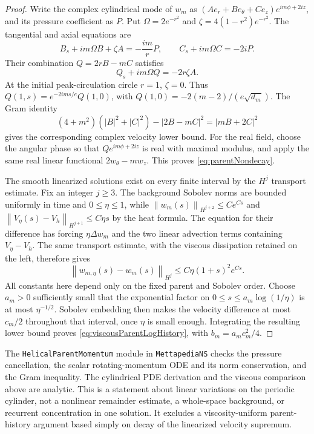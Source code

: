 \documentclass[11pt]{article}
\theoremstyle{remark}
\newcommand{\norm}[1]{\left\lVert#1\right\rVert}
\begin{document}
\begin{proof}
Write the complex cylindrical mode of $w_m$ as
$(A e_r+B e_\theta+C e_z)e^{im\phi+2iz}$, and its pressure
coefficient as $P$. Put $\Omega=2e^{-r^2}$ and
$\zeta=4(1-r^2)e^{-r^2}$. The tangential and axial equations are
\[
 B_s+im\Omega B+\zeta A=-\frac{im}{r}P,
 \qquad C_s+im\Omega C=-2iP.
\]
Their combination $Q=2rB-mC$ satisfies
\[
 Q_s+im\Omega Q=-2r\zeta A.
\]
At the initial peak-circulation circle $r=1$, $\zeta=0$. Thus
$Q(1,s)=e^{-2ims/e}Q(1,0)$, with
$Q(1,0)=-2(m-2)/(e\sqrt{d_m})$.
The Gram identity
\[
 (4+m^2)(|B|^2+|C|^2)-|2B-mC|^2=|mB+2C|^2
\]
gives the corresponding complex velocity lower bound. For the real
field, choose the angular phase so that $Qe^{im\phi+2iz}$ is real
with maximal modulus, and apply the same real linear functional
$2w_\theta-mw_z$. This proves \eqref{eq:parentNondecay}.

The smooth linearized solutions exist on every finite interval by the
$H^j$ transport estimate. Fix an integer $j\geq3$. The background
Sobolev norms are bounded uniformly in time and $0\leq\eta\leq1$,
while $\norm{w_m(s)}_{H^{j+2}}\leq C e^{Cs}$ and
$\norm{V_\eta(s)-V_h}_{H^{j+1}}\leq C\eta s$ by the heat formula.
The equation for their difference has forcing $\eta\Delta w_m$
and the two linear advection terms containing $V_\eta-V_h$.
The same transport estimate, with the viscous dissipation retained on
the left, therefore gives
\[
 \norm{w_{m,\eta}(s)-w_m(s)}_{H^j}
       \leq C\eta(1+s)^2e^{Cs}.
\]
All constants here depend only on the fixed parent and Sobolev order.
Choose $a_m>0$ sufficiently small that the exponential factor on
$0\leq s\leq a_m\log(1/\eta)$ is at most $\eta^{-1/2}$.
Sobolev embedding then makes the velocity difference at most $c_m/2$
throughout that interval, once $\eta$ is small enough. Integrating
the resulting lower bound proves \eqref{eq:viscousParentLogHistory},
with $b_m=a_mc_m^2/4$.
\end{proof}

The \texttt{HelicalParentMomentum} module in \texttt{MettapediaNS}
checks the pressure
cancellation, the scalar rotating-momentum ODE and its norm conservation,
and the Gram inequality. The cylindrical PDE derivation and the viscous
comparison above are analytic. This is a statement about linear
variations on the periodic cylinder, not a nonlinear remainder estimate,
a whole-space background, or recurrent concentration in one solution.
It excludes a viscosity-uniform parent-history argument based simply on
decay of the linearized velocity supremum.
\end{document}
